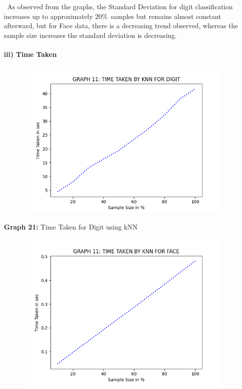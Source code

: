 \documentclass[10 pt]{report}   	%
\begin{document}
{{\begin{center}
\end{center}
\textbullet\ As observed from the graphs, the Standard Deviation for digit classification increases up to approximately 20\%\ samples but remains almost constant afterward, but for Face data, there is a decreasing trend observed, whereas the sample size increases the standard deviation is decreasing. \\ \\
\textbf{iii) Time Taken}
\begin{figure} [H]
\includegraphics [width = 11cm, height = 8cm]{KNN_TIME_DIGIT.png}
\end {figure}
\begin{center}
\small \textbf {Graph 21:} Time Taken for Digit using kNN\\
\end{center}
\begin{figure} [H]
\includegraphics [width = 11cm, height = 8cm]{KNN_TIME_FACE.png}
\end {figure}
\begin{center}

\end{center}}}
\end{document}
